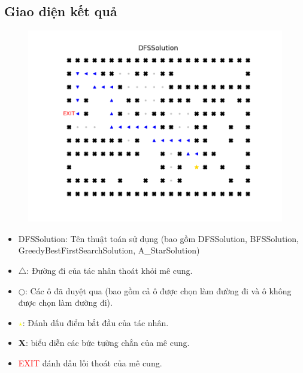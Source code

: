 \documentclass[11pt]{article} %
\begin{document}
\subsection{Giao diện kết quả}
	\begin{figure}[h] %
		\centering
		\includegraphics[width=0.8\columnwidth]{Figures/fg1_dfs.png} %
	\end{figure}
\begin{itemize}
	\item DFSSolution: Tên thuật toán sử dụng (bao gồm DFSSolution, BFSSolution, GreedyBestFirstSearchSolution, A\_StarSolution) \\
	\item \textbf{$\triangle$}: Đường đi của tác nhân thoát khỏi mê cung. \\
	\item \textbf{$\bigcirc$}: Các ô đã duyệt qua (bao gồm cả ô được chọn làm đường đi và ô không được chọn làm đường đi).\\
	\item \textcolor{yellow}{\textbf{$\star$}}: Đánh dấu điểm bắt đầu của tác nhân. \\
	\item \textbf{X}: biểu diễn các bức tường chắn của mê cung.\\
	\item \textcolor{red}{EXIT} đánh dấu lối thoát của mê cung.\
\end{itemize}

\newpage
\end{document}
